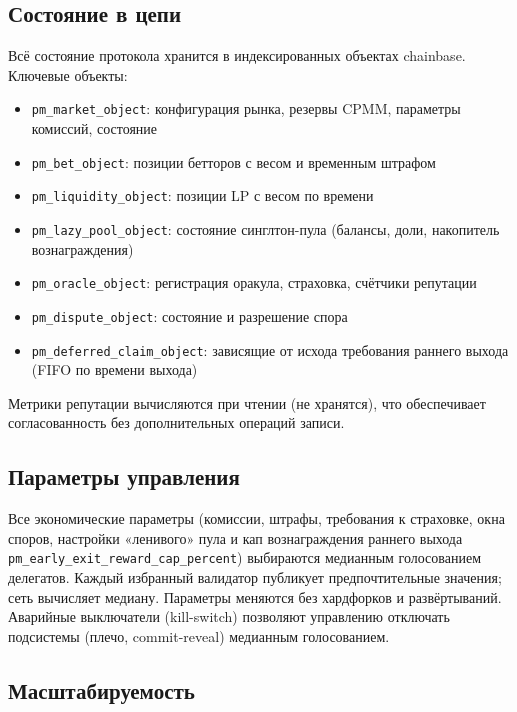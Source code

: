 \documentclass{ledger}
\theoremstyle{plain}
\theoremstyle{remark}
\begin{document}
\subsection{Состояние в цепи}\label{sec:onchainstate}

Всё состояние протокола хранится в индексированных объектах chainbase. Ключевые
объекты:

\begin{itemize}
  \item \texttt{pm\_market\_object}: конфигурация рынка, резервы CPMM, параметры комиссий, состояние
  \item \texttt{pm\_bet\_object}: позиции бетторов с весом и временным штрафом
  \item \texttt{pm\_liquidity\_object}: позиции LP с весом по времени
  \item \texttt{pm\_lazy\_pool\_object}: состояние синглтон-пула (балансы, доли, накопитель вознаграждения)
  \item \texttt{pm\_oracle\_object}: регистрация оракула, страховка, счётчики репутации
  \item \texttt{pm\_dispute\_object}: состояние и разрешение спора
  \item \texttt{pm\_deferred\_claim\_object}: зависящие от исхода требования раннего выхода (FIFO по времени выхода)
\end{itemize}

Метрики репутации вычисляются при чтении (не хранятся), что обеспечивает
согласованность без дополнительных операций записи.

\subsection{Параметры управления}\label{sec:governance}

Все экономические параметры (комиссии, штрафы, требования к страховке, окна споров,
настройки «ленивого» пула и кап вознаграждения раннего выхода
\texttt{pm\_early\_exit\_reward\_cap\_percent}) выбираются медианным голосованием
делегатов. Каждый избранный валидатор публикует предпочтительные значения; сеть
вычисляет медиану. Параметры меняются без хардфорков и развёртываний. Аварийные
выключатели (kill-switch) позволяют управлению отключать подсистемы (плечо,
commit-reveal) медианным голосованием.

\subsection{Масштабируемость}\label{sec:scalability}
\end{document}
